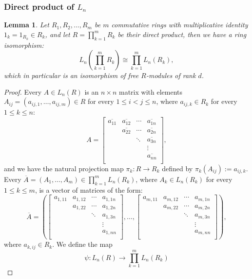 \documentclass{article}
\newtheorem{lemma4}[paragraph]{Lemma}
\begin{document}
\subsubsection{Direct product of $L_n$}
\begin{lemma4}
\label{lem:direct-product}
Let $R_1,R_2,\dots,R_{m}$ be $m$ commutative rings with multiplicative identity $1_k=1_{R_k}\in{R}_k$, and let $R=\prod_{k=1}^mR_k$ be their direct product, then we have a ring isomorphism: \[L_n\left(\prod_{k=1}^mR_k\right)\cong\prod_{k=1}^m{L}_n(R_k),\]
which in particular is an isomorphism of free $R$-modules of rank $d$.
\end{lemma4}
\begin{proof}
Every $A\in{L}_n(R)$ is an $n\times{n}$ matrix with elements $A_{ij}=\left(a_{ij,1},\dots,a_{ij,m}\right)\in{R}$ for every $1\leq{i}<j\leq{n}$, where $a_{ij,k}\in{R}_k$
for every $1\leq{k}\leq{n}$:
\[A=\begin{bmatrix}
\overline{a_{11}}&\overline{a_{12}}&\cdots&\overline{a_{1n}}\\
&\overline{a_{22}}&\cdots&\overline{a_{2n}}\\
&&\ddots&\overline{a_{3n}}\\
&&&\vdots\\
&&&\overline{a_{nn}}\\
\end{bmatrix},\]
and we have the natural projection map $\pi_k:R\longrightarrow{R}_k$ defined by $\pi_k(A_{ij}):=a_{ij,k}$.
Every $\overline{A}=\left(A_1,\dots,A_m\right)\in\prod_{k=1}^mL_n(R_k)$, where $A_k\in{L}_n(R_k)$ for every $1\leq{k}\leq{m}$, is a vector of matrices of the form:
\[
\overline{A}=\left(\begin{bmatrix}
a_{1,11}&a_{1,12}&\cdots&a_{1,1n}\\
&a_{1,22}&\cdots&a_{1,2n}\\
&&\ddots&a_{1,3n}\\
&&&\vdots\\
&&&a_{1,nn}\\
\end{bmatrix}
,\dots
,\begin{bmatrix}
a_{m,11}&a_{m,12}&\cdots&a_{m,1n}\\
&a_{m,22}&\cdots&a_{m,2n}\\
&&\ddots&a_{m,3n}\\
&&&\vdots\\
&&&a_{m,nn}\\
\end{bmatrix}\right),\]
where $a_{k,ij}\in{R}_k$.
We define the map \[\psi:L_n(R)\longrightarrow\prod_{k=1}^mL_n(R_k)\] 

\end{proof}
\end{document}
